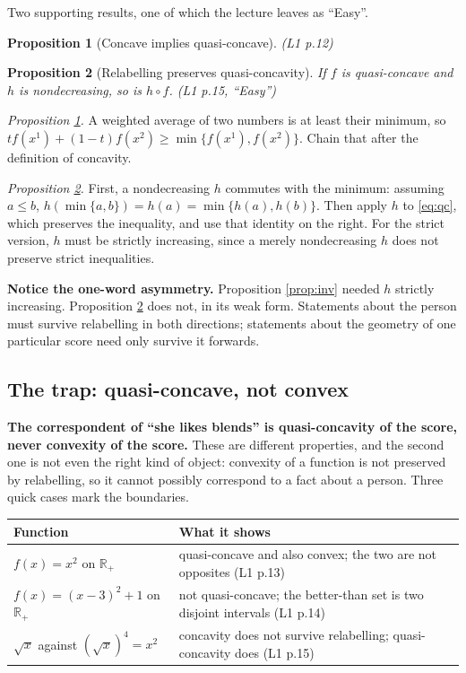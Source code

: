 \documentclass[11pt,letterpaper]{article}
\theoremstyle{definition}
\theoremstyle{plain}
\newtheorem{prop}{Proposition}
\newcommand{\src}[1]{{\small\textsf{(#1)}}}
\newcommand{\skipnote}{\noindent{\small\textsf{Proof. Skippable on a first read.}}\par\smallskip}
\begin{document}
Two supporting results, one of which the lecture leaves as ``Easy''.

\begin{prop}[Concave implies quasi-concave] \label{prop:conc} \src{L1 p.12}
\end{prop}
\begin{prop}[Relabelling preserves quasi-concavity] \label{prop:qcinv}
If $f$ is quasi-concave and $h$ is nondecreasing, so is $h \circ f$. \src{L1 p.15, ``Easy''}
\end{prop}

\skipnote
\begin{leftbar}
\small
\emph{Proposition \ref{prop:conc}.} A weighted average of two numbers is at least their minimum, so
$t f(x^1) + (1-t)f(x^2) \ge \min\{f(x^1),f(x^2)\}$. Chain that after the definition of concavity.

\emph{Proposition \ref{prop:qcinv}.} First, a nondecreasing $h$ commutes with the minimum: assuming
$a \le b$, $h(\min\{a,b\}) = h(a) = \min\{h(a),h(b)\}$. Then apply $h$ to \eqref{eq:qc}, which
preserves the inequality, and use that identity on the right. For the strict version, $h$ must be
strictly increasing, since a merely nondecreasing $h$ does not preserve strict inequalities.
\end{leftbar}

\textbf{Notice the one-word asymmetry.} Proposition \ref{prop:inv} needed $h$ strictly increasing.
Proposition \ref{prop:qcinv} does not, in its weak form. Statements about the person must survive
relabelling in both directions; statements about the geometry of one particular score need only
survive it forwards.

\subsection{The trap: quasi-concave, not convex}

\textbf{The correspondent of ``she likes blends'' is quasi-concavity of the score, never convexity
of the score.} These are different properties, and the second one is not even the right kind of
object: convexity of a function is not preserved by relabelling, so it cannot possibly correspond to
a fact about a person. Three quick cases mark the boundaries.

\begin{center}
\begin{tabular}{@{}p{} p{}@{}}
\toprule
\textbf{Function} & \textbf{What it shows} \\
\midrule
$f(x) = x^2$ on $\mathbb{R}_+$ & quasi-concave and also convex; the two are not opposites \src{L1 p.13} \\
$f(x) = (x-3)^2 + 1$ on $\mathbb{R}_+$ & not quasi-concave; the better-than set is two disjoint intervals \src{L1 p.14} \\
$\sqrt{x}$ against $(\sqrt{x})^4 = x^2$ & concavity does not survive relabelling; quasi-concavity does \src{L1 p.15} \\
\bottomrule
\end{tabular}
\end{center}
\end{document}
